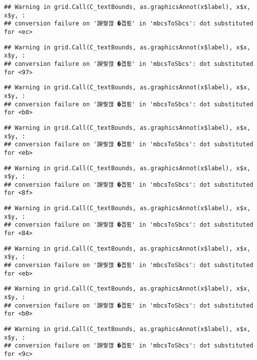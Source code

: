 \documentclass[
]{article}
\begin{document}
\begin{verbatim}
## Warning in grid.Call(C_textBounds, as.graphicsAnnot(x$label), x$x, x$y, :
## conversion failure on '諛쒖깮 �곕룄' in 'mbcsToSbcs': dot substituted for <ec>
\end{verbatim}

\begin{verbatim}
## Warning in grid.Call(C_textBounds, as.graphicsAnnot(x$label), x$x, x$y, :
## conversion failure on '諛쒖깮 �곕룄' in 'mbcsToSbcs': dot substituted for <97>
\end{verbatim}

\begin{verbatim}
## Warning in grid.Call(C_textBounds, as.graphicsAnnot(x$label), x$x, x$y, :
## conversion failure on '諛쒖깮 �곕룄' in 'mbcsToSbcs': dot substituted for <b0>
\end{verbatim}

\begin{verbatim}
## Warning in grid.Call(C_textBounds, as.graphicsAnnot(x$label), x$x, x$y, :
## conversion failure on '諛쒖깮 �곕룄' in 'mbcsToSbcs': dot substituted for <eb>
\end{verbatim}

\begin{verbatim}
## Warning in grid.Call(C_textBounds, as.graphicsAnnot(x$label), x$x, x$y, :
## conversion failure on '諛쒖깮 �곕룄' in 'mbcsToSbcs': dot substituted for <8f>
\end{verbatim}

\begin{verbatim}
## Warning in grid.Call(C_textBounds, as.graphicsAnnot(x$label), x$x, x$y, :
## conversion failure on '諛쒖깮 �곕룄' in 'mbcsToSbcs': dot substituted for <84>
\end{verbatim}

\begin{verbatim}
## Warning in grid.Call(C_textBounds, as.graphicsAnnot(x$label), x$x, x$y, :
## conversion failure on '諛쒖깮 �곕룄' in 'mbcsToSbcs': dot substituted for <eb>
\end{verbatim}

\begin{verbatim}
## Warning in grid.Call(C_textBounds, as.graphicsAnnot(x$label), x$x, x$y, :
## conversion failure on '諛쒖깮 �곕룄' in 'mbcsToSbcs': dot substituted for <b0>
\end{verbatim}

\begin{verbatim}
## Warning in grid.Call(C_textBounds, as.graphicsAnnot(x$label), x$x, x$y, :
## conversion failure on '諛쒖깮 �곕룄' in 'mbcsToSbcs': dot substituted for <9c>
\end{verbatim}
\end{document}
